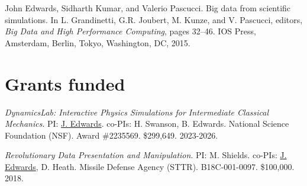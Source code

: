 \documentclass[margin,line]{res}
\begin{document}
\begin{resume}
John Edwards, Sidharth Kumar, and Valerio Pascucci. Big data from scientific simulations. In L. Grandinetti, G.R. Joubert, M. Kunze, and V. Pascucci, editors, \textit{Big Data and High Performance Computing}, pages 32--46. IOS Press, Amsterdam, Berlin, Tokyo, Washington, DC, 2015.

%




\section{\sc Grants funded}
\textit{DynamicsLab: Interactive Physics Simulations for Intermediate Classical Mechanics}. PI: \underline{J. Edwards}. co-PIs: H. Swanson, B. Edwards. National Science Foundation (NSF). Award \#2235569. \$299,649. 2023-2026.

\textit{Revolutionary Data Presentation and Manipulation}. PI: M. Shields. co-PIs: \underline{J. Edwards}, D. Heath. Missile Defense Agency (STTR). B18C-001-0097. \$100,000. 2018.


\end{resume}
\end{document}
